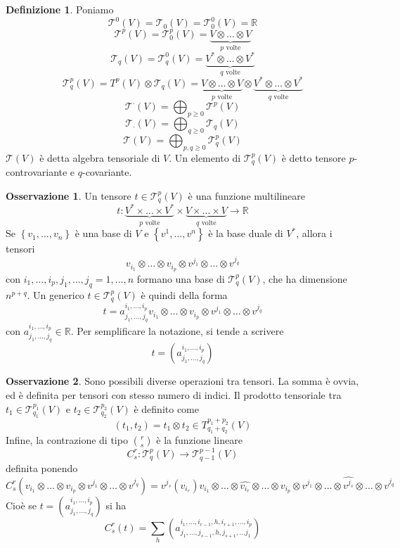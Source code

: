 \documentclass[a4paper,11pt]{article}
\theoremstyle{definition}
\newtheorem{osservazione}{Osservazione}[section]
\newtheorem{definizione}{Definizione}[section]
\theoremstyle{theorem}
\newcommand{\T}{\mathcal{T}}
\begin{document}
\begin{definizione}
	Poniamo 
	\[\T^0(V)=\T_0(V)=\T^0_0(V)=\mathbb{R}\]
	\[\T^p(V)=\T^p_0(V)=\underbrace{V\otimes \dots\otimes V}_{\textrm{$p$ volte}}\]
	\[\T_q(V)=\T^0_q(V)=\underbrace{V^*\otimes\dots\otimes V^*}_{\textrm{$q$ volte}}\]
	\[\T^p_q(V)=T^p(V)\otimes \T_q(V)=\underbrace{V\otimes\dots\otimes V}_{\textrm{$p$ volte}}\otimes\underbrace{V^*\otimes\dots\otimes V^*}_{\textrm{$q$ volte}}\]
	\[\T^\cdot(V)=\bigoplus_{p\geq 0}\T^p(V)\]
	\[\T_\cdot(V)=\bigoplus_{q\geq 0}\T_q(V)\]
	\[\T(V)=\bigoplus_{p,q\geq0}\T^p_q(V)\]
	$\T(V)$ è detta algebra tensoriale di $V$. Un elemento di $\T^p_q(V)$ è detto tensore $p$-controvariante e $q$-covariante.
\end{definizione}
\begin{osservazione}
	Un tensore $t\in \T^p_q(V)$ è una funzione multilineare
	\[t\colon\underbrace{V^*\times\dots\times V^*}_{\textrm{$p$ volte}}\times\underbrace{V\times\dots\times V}_{\textrm{$q$ volte}}\to\mathbb{R}\]
	Se $\left\{v_1,\dots,v_n\right\}$ è una base di $V$ e $\left\{v^1,\dots, v^n\right\}$ è la base duale di $V^*$, allora i tensori
	\[v_{i_1}\otimes\dots\otimes v_{i_p}\otimes v^{j_1}\otimes\dots\otimes v^{j_q}\]
	con $i_1,\dots,i_p,j_1,\dots,j_q=1,\dots,n$ formano una base di $\T^p_q(V)$, che ha dimensione $n^{p+q}$. Un generico $t\in\T^p_q(V)$ è quindi della forma
	\[t=a^{i_1,\dots,i_p}_{j_1,\dots,j_q}v_{i_1}\otimes\dots\otimes v_{i_p}\otimes v^{j_1}\otimes\dots\otimes v^{j_q}\]
	con $a^{i_1,\dots,i_p}_{j_1,\dots,j_q}\in\mathbb{R}$. Per semplificare la notazione, si tende a scrivere
	\[t=\left(a^{i_1,\dots,i_p}_{j_1,\dots,j_q}\right)\]
\end{osservazione}
\begin{osservazione}
	Sono possibili diverse operazioni tra tensori. La somma è ovvia, ed è definita per tensori con stesso numero di indici. Il prodotto tensoriale tra $t_1\in \T^{p_1}_{q_1}(V)$ e $t_2\in \T^{p_2}_{q_2}(V)$ è definito come \[(t_1, t_2)=t_1\otimes t_2\in T^{p_1+p_2}_{q_1+q_2}(V)\] Infine, la contrazione di tipo $\binom{r}{s}$ è la funzione lineare
	\[C^r_s\colon \T^p_q(V)\to \T^{p-1}_{q-1}(V)\]
	definita ponendo
	\[C^r_s(v_{i_1}\otimes\dots\otimes v_{i_p}\otimes v^{j_1}\otimes\dots\otimes v^{j_q})=v^{j_s}(v_{i_r})v_{i_1}\otimes\dots\otimes\widehat{v_{i_r}}\otimes\dots\otimes v_{i_p}\otimes v^{j_1}\otimes\dots\otimes\widehat{v^{j_s}}\otimes\dots\otimes v^{j_q}\]
	Cioè se $t=\left(a^{i_1,\dots,i_p}_{j_1,\dots,j_q}\right)$ si ha
	\[C^r_s(t)=\sum_{h}\left(a^{i_1,\dots,i_{r-1},h,i_{r+1},\dots,i_p}_{j_1,\dots,j_{s-1},h,j_{s+1},\dots j_1}\right)\]
\end{osservazione}
\end{document}
